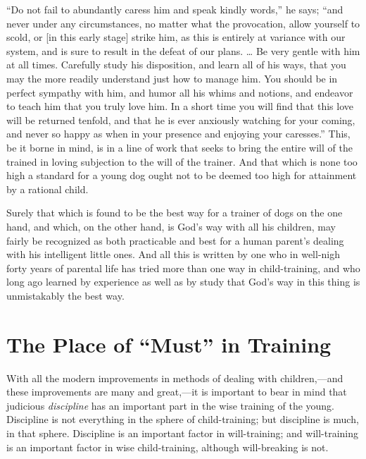 \documentclass[
]{book}
\begin{document}
``Do not fail to abundantly caress him and speak kindly words,'' he says; ``and never under any circumstances, no matter what the provocation, allow yourself to scold, or {[}in this early stage{]} strike him, as this is entirely at variance with our system, and is sure to result in the defeat of our plans. \ldots{} Be very gentle with him at all times. Carefully study his disposition, and learn all of his ways, that you may the more readily understand just how to manage him. You should be in perfect sympathy with him, and humor all his whims and notions, and endeavor to teach him that you truly love him. In a short time you will find that this love will be returned tenfold, and that he is ever anxiously watching for your coming, and never so happy as when in your presence and enjoying your caresses.'' This, be it borne in mind, is in a line of work that seeks to bring the entire will of the trained in loving subjection to the will of the trainer. And that which is none too high a standard for a young dog ought not to be deemed too high for attainment by a rational child.

Surely that which is found to be the best way for a trainer of dogs on the one hand, and which, on the other hand, is God's way with all his children, may fairly be recognized as both practicable and best for a human parent's dealing with his intelligent little ones. And all this is written by one who in well-nigh forty years of parental life has tried more than one way in child-training, and who long ago learned by experience as well as by study that God's way in this thing is unmistakably the best way.

\hypertarget{the-place-of-must-in-training}{%
\chapter{The Place of ``Must'' in Training}\label{the-place-of-must-in-training}}

With all the modern improvements in methods of dealing with children,---and these improvements are many and great,---it is important to bear in mind that judicious \emph{discipline} has an important part in the wise training of the young. Discipline is not everything in the sphere of child-training; but discipline is much, in that sphere. Discipline is an important factor in will-training; and will-training is an important factor in wise child-training, although will-breaking is not.
\end{document}
